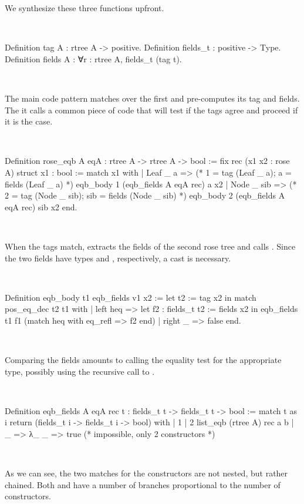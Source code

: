 \documentclass[a4paper, 11pt]{book}
\newenvironment{rocqcode}
  {\VerbatimEnvironment~\\\begin{rocqbox}\begin{xrocqcode}}{\end{xrocqcode}
\end{rocqbox}\\}
\begin{document}
We synthesize these three functions upfront.

\begin{rocqcode}
Definition tag A : rtree A -> positive.
Definition fields_t : positive -> Type.
Definition fields A :  ∀r : rtree A, fields_t (tag t).
\end{rocqcode}

The main code pattern matches over the first  and 
pre-computes its tag and fields. The it calls a common piece of
code  that will test if the tags agree and proceed
if it is the case.

\begin{rocqcode}
Definition rose_eqb A eqA : rtree A -> rtree A -> bool := 
  fix rec (x1 x2 : rose A) {struct x1} : bool :=
    match x1 with
    | Leaf _ a =>
        (* 1 = tag (Leaf _ a); a = fields (Leaf _ a) *)
        eqb_body 1 (eqb_fields A eqA rec) a x2
    | Node _ sib =>            
        (* 2 = tag (Node _ sib); sib = fields (Node _ sib) *)
        eqb_body 2 (eqb_fields A eqA rec) sib x2
    end.
\end{rocqcode}


When the tags match,  extracts the fields of the second rose
tree and calls . Since the two fields have types
 and , respectively, a cast is necessary.

\begin{rocqcode}
Definition eqb_body t1 eqb_fields v1 x2 :=
  let t2 := tag x2 in
  match pos_eq_dec t2 t1 with
  | left heq =>
    let f2 : fields_t t2 := fields x2 in
    eqb_fields t1 f1 (match heq with eq_refl => f2 end)
  | right _ => false
  end.
\end{rocqcode}

Comparing the fields amounts to calling the equality test for the appropriate
type, possibly using the recursive call to .

\begin{rocqcode}
Definition eqb_fields A eqA rec t :
  fields_t t -> fields_t t -> bool
:=
  match t as i return (fields_t i -> fields_t i -> bool) with
  | 1%
  | 2%
                    list_eqb (rtree A) rec a b
  | _ => λ_ _ => true (* impossible, only 2 constructors *)
\end{rocqcode}

As we can see, the two matches for the constructors are not nested, but rather
chained. Both  and  have a number of branches
proportional to the number of constructors.
\end{document}
